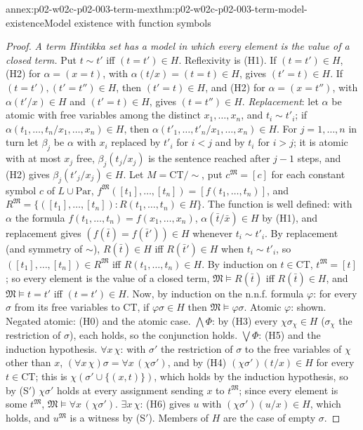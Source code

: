 \begin{annexitem}{annex:p02-w02c-p02-003-term-mex}{thm:p02-w02c-p02-003-term-model-existence}{Model existence with function symbols}
\begin{proof}
\emph{A term Hintikka set has a model in which every element is the value
of a closed term.}  Put \(t\sim t'\) iff \((t=t')\in H\).  Reflexivity is
(H1).  If \((t=t')\in H\), (H2) for \(\alpha=(x=t)\), with
\(\alpha(t/x)=(t=t)\in H\), gives \((t'=t)\in H\).  If \((t=t'),(t'=t'')\in
H\), then \((t'=t)\in H\), and (H2) for \(\alpha=(x=t'')\), with
\(\alpha(t'/x)\in H\) and \((t'=t)\in H\), gives \((t=t'')\in H\).
\emph{Replacement}: let \(\alpha\) be atomic with free variables among the
distinct \(x_1,\ldots,x_n\), and \(t_i\sim t'_i\); if
\(\alpha(t_1,\ldots,t_n/x_1,\ldots,x_n)\in H\), then
\(\alpha(t'_1,\ldots,t'_n/x_1,\ldots,x_n)\in H\).  For \(j=1,\ldots,n\) in
turn let \(\beta_j\) be \(\alpha\) with \(x_i\) replaced by \(t'_i\) for
\(i<j\) and by \(t_i\) for \(i>j\); it is atomic with at most \(x_j\) free,
\(\beta_j(t_j/x_j)\) is the sentence reached after \(j-1\) steps, and (H2)
gives \(\beta_j(t'_j/x_j)\in H\).  Let \(M=\mathrm{CT}/{\sim}\), put
\(c^{\mathfrak M}=[c]\) for each constant symbol \(c\) of
\(L\cup\mathrm{Par}\),
\(f^{\mathfrak M}([t_1],\ldots,[t_n])=[f(t_1,\ldots,t_n)]\), and
\(R^{\mathfrak M}=\{([t_1],\ldots,[t_n]):R(t_1,\ldots,t_n)\in H\}\).  The
function is well defined: with \(\alpha\) the formula
\(f(t_1,\ldots,t_n)=f(x_1,\ldots,x_n)\), \(\alpha(\bar t/\bar x)\in H\) by
(H1), and replacement gives \((f(\bar t)=f(\bar t'))\in H\) whenever
\(t_i\sim t'_i\).  By replacement (and symmetry of \(\sim\)),
\(R(\bar t)\in H\) iff \(R(\bar t')\in H\) when \(t_i\sim t'_i\), so
\(([t_1],\ldots,[t_n])\in R^{\mathfrak M}\) iff \(R(t_1,\ldots,t_n)\in H\).
By induction on \(t\in\mathrm{CT}\), \(t^{\mathfrak M}=[t]\); so every
element is the value of a closed term, \(\mathfrak M\models R(\bar t)\) iff
\(R(\bar t)\in H\), and \(\mathfrak M\models t=t'\) iff \((t=t')\in H\).
Now, by induction on the n.n.f. formula \(\varphi\): for every \(\sigma\)
from its free variables to \(\mathrm{CT}\), if \(\varphi\sigma\in H\) then
\(\mathfrak M\models\varphi\sigma\).  Atomic \(\varphi\): shown.  Negated
atomic: (H0) and the atomic case.  \(\bigwedge\Phi\): by (H3) every
\(\chi\sigma_\chi\in H\) (\(\sigma_\chi\) the restriction of \(\sigma\)),
each holds, so the conjunction holds.  \(\bigvee\Phi\): (H5) and the
induction hypothesis.  \(\forall x\,\chi\): with \(\sigma'\) the
restriction of \(\sigma\) to the free variables of \(\chi\) other than
\(x\), \((\forall x\,\chi)\sigma=\forall x\,(\chi\sigma')\), and by (H4)
\((\chi\sigma')(t/x)\in H\) for every \(t\in\mathrm{CT}\); this is
\(\chi(\sigma'\cup\{(x,t)\})\), which holds by the induction hypothesis,
so by (S\('\)) \(\chi\sigma'\) holds at every assignment sending \(x\) to
\(t^{\mathfrak M}\); since every element is some \(t^{\mathfrak M}\),
\(\mathfrak M\models\forall x\,(\chi\sigma')\).  \(\exists x\,\chi\): (H6)
gives \(u\) with \((\chi\sigma')(u/x)\in H\), which holds, and
\(u^{\mathfrak M}\) is a witness by (S\('\)).  Members of \(H\) are the case
of empty \(\sigma\).


\end{proof}
\end{annexitem}
